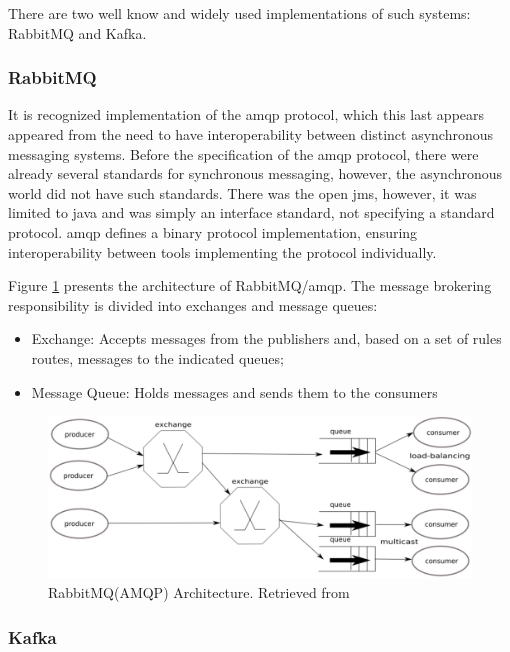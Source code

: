 There are two well know and widely used implementations of such systems: RabbitMQ and Kafka\cite{kafka-vs-rabbitmq}.

\subsubsection{RabbitMQ}

It is recognized implementation of the \gls{amqp} protocol, which this last appears appeared from the need to have interoperability between distinct asynchronous messaging systems.
Before the specification of the \gls{amqp} protocol, there were already several standards for synchronous messaging, however, the asynchronous world did not have such standards.
There was the open \gls{jms}, however, it was limited to java and was simply an interface standard, not specifying a standard protocol.
\gls{amqp} defines a binary protocol implementation, ensuring interoperability between tools implementing the protocol individually.

Figure \ref{fig:rabbitmq} presents the architecture of RabbitMQ/\gls{amqp}.
The message brokering responsibility is divided into exchanges and message queues:

\begin{itemize}
    \item Exchange: Accepts messages from the publishers and, based on a set of rules routes, messages to the indicated queues;
    \item Message Queue: Holds messages and sends them to the consumers
\end{itemize}

\begin{figure}[H]
    \center
    \includegraphics[width=.9\textwidth]{rabbitmq}
    \caption{RabbitMQ(AMQP) Architecture. Retrieved from \cite{kafka-vs-rabbitmq}}
    \label{fig:rabbitmq}
\end{figure}

\subsubsection{Kafka}

